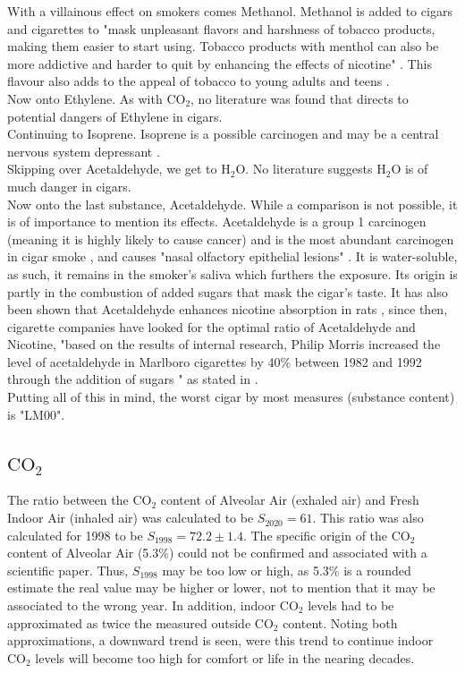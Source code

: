 \documentclass[reprint,amsmath,amssymb,aps, prl]{revtex4-2}
\begin{document}
With a villainous effect on smokers comes Methanol. Methanol is added to cigars and cigarettes to "mask unpleasant flavors and harshness of tobacco products, making them easier to start using. Tobacco products with menthol can also be more addictive and harder to quit by enhancing the effects of nicotine" \cite{MethanolFDA}. This flavour also adds to the appeal of tobacco to young adults and teens \cite{MethanolFDA}.\\
Now onto Ethylene. As with $\text{CO}_2$, no literature was found that directs to potential dangers of Ethylene in cigars.\\
Continuing to Isoprene. Isoprene is a possible carcinogen and may be a central nervous system depressant \cite{PubChemIsoprene}.\\
Skipping over Acetaldehyde, we get to $\text{H}_2\text{O}$. No literature suggests $\text{H}_2\text{O}$ is of much danger in cigars. \\
Now onto the last substance, Acetaldehyde. While a comparison is not possible, it is of importance to mention its effects. Acetaldehyde is a group 1 carcinogen (meaning it is highly likely to cause cancer) and is the most abundant carcinogen in cigar smoke \cite{AcetaldehydeIARC}\cite{AcetaldehydeInCigars}, and causes "nasal olfactory epithelial lesions" \cite{SubstanceDangerPaper}. It is water-soluble, as such, it remains in the smoker's saliva which furthers the exposure. Its origin is partly in the combustion of added sugars that mask the cigar's taste. It has also been shown that Acetaldehyde enhances nicotine absorption in rats \cite{AcetaldehydeInRats}, since then, cigarette companies have looked for the optimal ratio of Acetaldehyde and Nicotine, "based on the results of internal research, Philip Morris increased the level of acetaldehyde in Marlboro cigarettes by 40\% between 1982 and 1992 through the addition of sugars \cite{FortyPercentIncrease}" as stated in \cite{CigarCompaniesInternal}.\\ 
Putting all of this in mind, the worst cigar by most measures (substance content) is "LM00". 

\subsection{$\text{CO}_{2}$}
The ratio between the $\text{CO}_{2}$ content of Alveolar Air (exhaled air) and Fresh Indoor Air (inhaled air) was calculated to be $S_{2020}=61$. This ratio was also calculated for 1998 to be $S_{1998}=72.2\pm1.4$\cite{bookWithCO2inBreath}\cite{tans2009noaa}. The specific origin of the $\text{CO}_2$ content of Alveolar Air (5.3\%) could not be confirmed and associated with a scientific paper. Thus, $S_{1998}$ may be too low or high, as 5.3\% is a rounded estimate the real value may be higher or lower, not to mention that it may be associated to the wrong year. In addition, indoor $\text{CO}_2$ levels had to be approximated as twice the measured outside $\text{CO}_2$ content. Noting both approximations, a downward trend is seen, were this trend to continue indoor $\text{CO}_2$ levels will become too high for comfort or life in the nearing decades\cite{Jacobson2019}.
\end{document}
